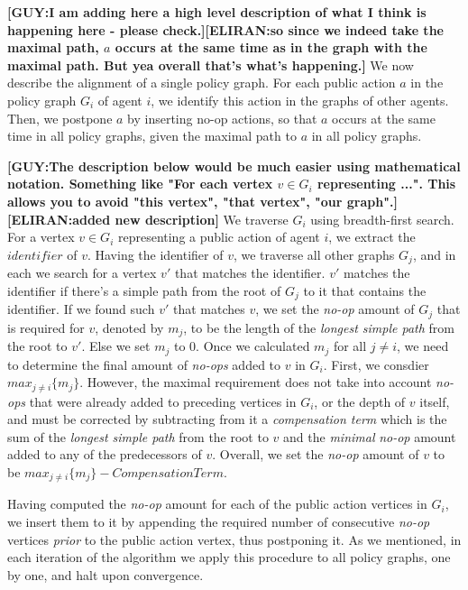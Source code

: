 \documentclass[letterpaper]{article} %
\newcommand{\eliran}[1]{\textbf{[\color{red}ELIRAN:#1]}}
\newcommand{\guy}[1]{\textbf{[\color{orange}GUY:#1]}}
\begin{document}
\guy{I am adding here a high level description of what I think is happening here - please check.}\eliran{so since we indeed take the maximal path, $a$ occurs at the same time as in the graph with the maximal path. But yea overall that's what's happening.}
We now describe the alignment of a single policy graph. For each public action $a$ in the policy graph $G_i$ of agent $i$, we identify this action in the graphs of other agents.
Then, we postpone $a$ by inserting no-op actions, so that $a$ occurs at the same time in all policy graphs, given the maximal path to $a$ in all policy graphs.



\guy{The description below would be much easier using mathematical notation. Something like "For each vertex $v \in G_i$ representing ...". This allows you to avoid "this vertex", "that vertex", "our graph".}\eliran{added new description}
We traverse $G_i$ using breadth-first search. For a vertex $v\in G_i$ representing a public action of agent $i$, we extract the $identifier$ of $v$. Having the identifier of $v$, we traverse all other graphs $G_j$, and in each we search for a vertex $v'$ that matches the identifier. $v'$ matches the identifier if there's a simple path from the root of $G_j$ to it that contains the identifier.
If we found such $v'$ that matches $v$, we set the {\em no-op} amount of $G_j$ that is required for $v$, denoted by $m_j$, to be the length of the \emph{longest simple path} from the root to $v'$. Else we set $m_j$ to 0.
Once we calculated $m_j$ for all $j\neq i$, we need to determine the final amount of {\em no-ops} added to $v$ in $G_i$. First, we consdier $max_{j\neq i}\{m_j\}$. However, the maximal requirement does not take into account {\em no-ops} that were already added to preceding vertices in $G_i$, or the depth of $v$ itself, and must be
corrected by subtracting from it a \emph{compensation term} which is the sum of the \emph{longest simple path} from the root to $v$ and the \emph{minimal} {\em no-op} amount added to any of the predecessors of $v$. Overall, we set the {\em no-op} amount of $v$ to be $max_{j\neq i}\{m_j\} - \mathit{CompensationTerm}$.

Having computed the  {\em no-op} amount for each of the public action vertices in $G_i$, we insert them to it by appending the required number of consecutive {\em no-op} vertices \emph{prior} to the public action vertex, thus postponing it.
As we mentioned, in each iteration of the algorithm we apply this procedure to all policy graphs, one by one, and halt upon convergence.
\end{document}
